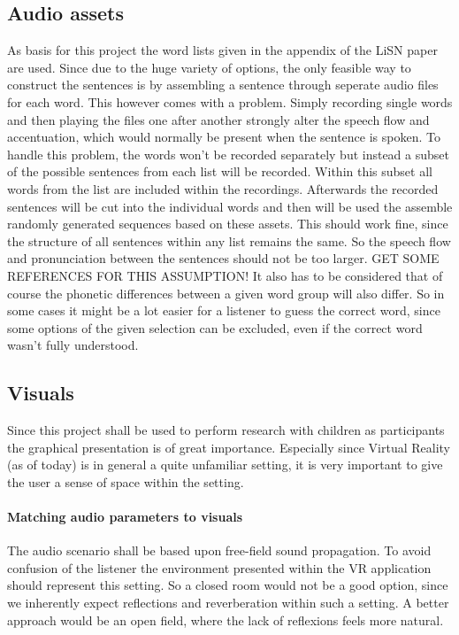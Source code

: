 \documentclass[a4paper,11pt]{article}%
\renewcommand{\\}{\vspace*{0.5\baselineskip} \newline}
\begin{document}
\subsection{Audio assets}
\label{sec:audio_assets}
As basis for this project the word lists given in the appendix of the LiSN paper \cite{lins} are used. Since due to the huge variety of options, the only feasible way to construct the sentences is by assembling a sentence through seperate audio files for each word. This however comes with a problem. Simply recording single words and then playing the files one after another strongly alter the speech flow and accentuation, which would normally be present when the sentence is spoken.
\newline
\newline
To handle this problem, the words won't be recorded separately but instead a subset of the possible sentences from each list will be recorded. Within this subset all words from the list are included within the recordings. Afterwards the recorded sentences will be cut into the individual words and then will be used the assemble randomly generated sequences based on these assets. This should work fine, since the structure of all sentences within any list remains the same. So the speech flow and pronunciation between the sentences should not be too larger. GET SOME REFERENCES FOR THIS ASSUMPTION!
\newline
\newline
It also has to be considered that of course the phonetic differences between a given word group will also differ. So in some cases it might be a lot easier for a listener to guess the correct word, since some options of the given selection can be excluded, even if the correct word wasn't fully understood.

\subsection{Visuals}
\label{sec:visuals}
Since this project shall be used to perform research with children as participants the graphical presentation is of great importance. Especially since Virtual Reality (as of today) is in general a quite unfamiliar setting, it is very important to give the user a sense of space within the setting.

\paragraph{Matching audio parameters to visuals} The audio scenario shall be based upon free-field sound propagation. To avoid confusion of the listener the environment presented within the VR application should represent this setting. So a closed room would not be a good option, since we inherently expect reflections and reverberation within such a setting. A better approach would be an open field, where the lack of reflexions feels more natural.
\end{document}
